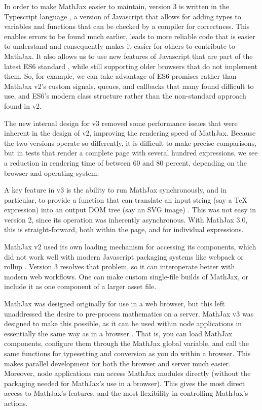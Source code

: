 \documentclass[11pt]{article} %
\begin{document}
In order to make MathJax easier to maintain, version 3 is written in the
Typescript language \cite{Typescript}, a version of Javascript that allows for
adding types to variables and functions that can be checked by a compiler for
correctness.  This enables errors to be found much earlier, leads to more
reliable code that is easier to understand and consequently makes it easier for
others to contribute to MathJax.  It also allows us to use new features of
Javascript that are part of the latest ES6 standard \cite{ES6}, while still
supporting older browsers that do not implement them.  So, for example, we can
take advantage of ES6 promises \cite{ES6-promise} rather than MathJax v2's
custom signals, queues, and callbacks that many found difficult to use, and
ES6's modern class structure \cite{ES6-class} rather than the non-standard
approach found in v2.

The new internal design for v3 removed some performance issues that
were inherent in the design of v2, improving the rendering speed of
MathJax.  Because the two versions operate so differently, it is
difficult to make precise comparisons, but in tests that render a
complete page with several hundred expressions, we see a reduction in
rendering time of between 60 and 80 percent, depending on the browser
and operating system.

A key feature in v3 is the ability to run MathJax synchronously, and
in particular, to provide a function that can translate an input
string (say a TeX expression) into an output DOM tree (say an SVG
image) \cite{MJ-convert}. This was not easy in version 2, since its
operation was inherently asynchronous. With MathJax 3.0, this is
straight-forward, both within the page, and for individual
expressions.

MathJax v2 used its own loading mechanism for accessing its
components, which did not work well with modern Javascript packaging systems
like webpack \cite{webpack} or rollup \cite{rollup}.  Version 3
resolves that problem, so it can interoperate better with modern web
workflows. One can make custom single-file builds of MathJax, or
include it as one component of a larger asset file.

MathJax was designed originally for use in a web browser, but this
left unaddressed the desire to pre-process mathematics on a
server. MathJax v3 was designed to make this possible, as it can be
used within node applications in essentially the same way as in a
browser \cite{MJ-web, MJ-node}. That is, you can load MathJax
components, configure them through the MathJax global variable, and
call the same functions for typesetting and conversion as you do
within a browser. This makes parallel development for both the browser
and server much easier.  Moreover, node applications can access
MathJax modules directly (without the packaging needed for MathJax's
use in a browser). This gives the most direct access to MathJax’s
features, and the most flexibility in controlling MathJax’s actions.
\end{document}
